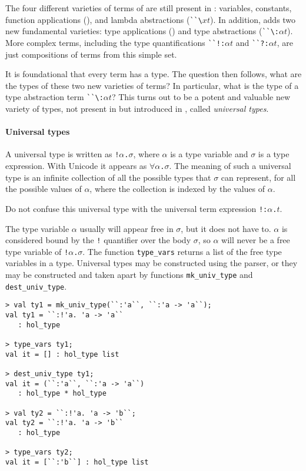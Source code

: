 The four different varieties of terms of \HOL{} are still present in \HOLW:
variables, constants, function applications (),
and lambda abstractions ({\small\verb|``\|}$x$$t$).
In addition, \HOLW{} adds two new fundamental varieties:
type applications () and
type abstractions ({\small\verb|``\:|}$\alpha$$t$).
More complex terms, including the type quantifications
{\small\verb|``!:|}$\alpha$$t$ and
{\small\verb|``?:|}$\alpha$$t$,
are just compositions of terms from this simple set.

It is foundational that every term has a type. The question then follows,
what are the types of these two new varieties of terms?
In particular, what is the type of a type abstraction term
{\small\verb|``\:|}$\alpha$$t$?
This turns out to be
a potent and valuable
new variety of types, not present in \HOL{} but introduced in \HOLW,
called {\it universal types}.

\paragraph{Universal types}

A universal type is written as \texttt{!$\alpha$.$\sigma$},
where $\alpha$ is a type variable and $\sigma$ is a type expression.
With Unicode it appears as \texttt{$\forall\alpha$.$\sigma$}.
The meaning of such a universal type is an infinite collection of all the possible
types that $\sigma$ can represent, for all the possible values of $\alpha$,
where the collection is indexed by the values of $\alpha$.

Do not confuse this universal type with
the universal term expression \texttt{!:$\alpha$.$t$}.

The type variable $\alpha$ usually will appear free in $\sigma$,
but it does not have to.  $\alpha$ is considered bound by the \texttt{!}
quantifier over the body $\sigma$, so $\alpha$ will never be a free type
variable of \texttt{!$\alpha$.$\sigma$}.
The \ML{} function \texttt{type\_vars} returns a list of the free type
variables in a type.
Universal types may be constructed using the parser, or
they may be constructed and taken apart by \ML{} functions
\texttt{mk\_univ\_type} and \texttt{dest\_univ\_type}.
%
\begin{session}
\begin{verbatim}
> val ty1 = mk_univ_type(``:'a``, ``:'a -> 'a``);
val ty1 = ``:!'a. 'a -> 'a``
   : hol_type

> type_vars ty1;
val it = [] : hol_type list

> dest_univ_type ty1;
val it = (``:'a``, ``:'a -> 'a``)
   : hol_type * hol_type

> val ty2 = ``:!'a. 'a -> 'b``;
val ty2 = ``:!'a. 'a -> 'b``
   : hol_type

> type_vars ty2;
val it = [``:'b``] : hol_type list
\end{verbatim}
\end{session}


